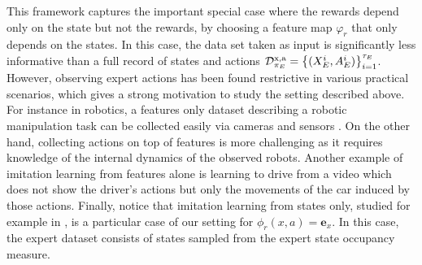 This framework captures the important special case where the rewards depend only on the state but not the rewards, 
by choosing a feature map $\varphi_r$ that only depends on the states. In this case, the data set taken as input is 
significantly less informative than a full record of states and actions $\mathcal{D}^{\mathrm{x,a}}_{\pi_E} = 
\left\{{(X^i_E, A^i_E)}\right\}^{\tau_E}_{i=1}$. However, observing expert actions has been found restrictive in various practical 
scenarios, which gives a strong motivation to study the setting described above.
% 
For instance in robotics, a features only dataset describing a robotic manipulation task 
can be collected easily 
via cameras and sensors \citep{torabi2018generative,zhu2020off,yang2019imitation,torabi2019recent}.
On the other hand, collecting actions on top of features is more challenging as it 
requires knowledge of the internal dynamics of the observed robots. 
Another example of imitation learning from features alone is learning to drive from a video 
which does not show the driver's actions but only the movements of the car induced by those actions.
Finally, notice that imitation learning from states only, studied for example in \cite{sun2019provably}, is a particular 
case of our setting for $\phi_r(x,a) = \mathbf{e}_x$. In this case, the expert dataset consists of states sampled from 
the expert state occupancy measure.

